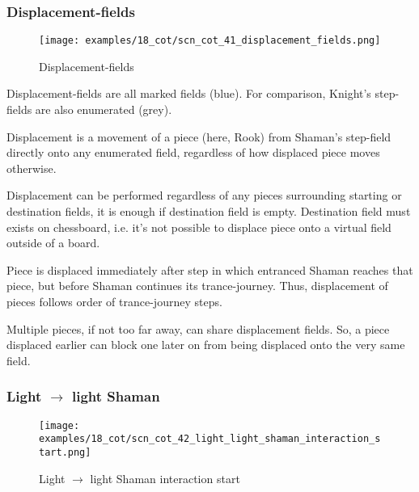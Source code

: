 \subsubsection*{Displacement-fields}
\label{sec:Conquest of Tlalocan/Trance-journey/Interactions/Displacement-fields}

\vspace*{-1.5\baselineskip}
\noindent
\begin{figure}[!h]
\texttt{[image: examples/18\_cot/scn\_cot\_41\_displacement\_fields.png]}
\caption{Displacement-fields}
\label{fig:scn_cot_41_displacement_fields}
\end{figure}

Displacement-fields are all marked fields (blue). For comparison, Knight's
step-fields are also enumerated (grey).

Displacement is a movement of a piece (here, Rook) from Shaman's step-field directly
onto any enumerated field, regardless of how displaced piece moves otherwise.

Displacement can be performed regardless of any pieces surrounding starting or
destination fields, it is enough if destination field is empty. Destination field
must exists on chessboard, i.e. it's not possible to displace piece onto a virtual
field outside of a board.

Piece is displaced immediately after step in which entranced Shaman reaches that
piece, but before Shaman continues its trance-journey. Thus, displacement of pieces
follows order of trance-journey steps.

Multiple pieces, if not too far away, can share displacement fields. So, a piece
displaced earlier can block one later on from being displaced onto the very same
field.

\clearpage %

\subsubsection*{Light $\rightarrow$ light Shaman}
\label{sec:Conquest of Tlalocan/Trance-journey/Interactions/Light --> light Shaman}

\vspace*{-1.2\baselineskip}
\noindent
\begin{figure}[!h]
\texttt{[image: examples/18\_cot/scn\_cot\_42\_light\_light\_shaman\_interaction\_start.png]}
\caption{Light $\rightarrow$ light Shaman interaction start}
\label{fig:scn_cot_42_light_light_shaman_interaction_start}
\end{figure}

